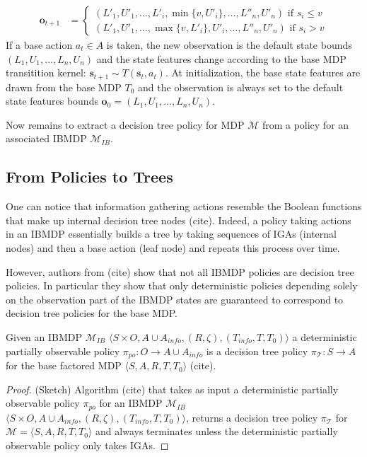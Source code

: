 \begin{definition}
\begin{itemize}
\begin{align*}
    \boldsymbol{o}_{t+1} &= \begin{cases}
        (L'_1, U'_1, \dots , L'_i, \min\{v, U'_i\}, \dots , L''_n, U'_n) \text{ if } s_i \leq v\\
        (L'_1, U'_1, \dots , \max\{v, L'_i\}, U'_i, \dots , L''_n, U'_n) \text{ if } s_i > v
    \end{cases}
\end{align*}
If a base action $a_t\in A$ is taken, the new observation is the default state bounds $(L_1, U_1,\dots, L_n, U_n)$ and the state features change according to the base MDP transitition kernel: $\boldsymbol{s}_{t+1}\sim T(\boldsymbol{s}_t, a_t)$.
At initialization, the base state features are drawn from the base MDP $T_0$ and the observation is always set to the default state features bounds $\boldsymbol{o}_0=(L_1, U_1,\dots, L_n, U_n)$.
\end{itemize}
\end{definition}

Now remains to extract a decision tree policy for MDP $\mathcal{M}$ from a policy for an associated IBMDP $\mathcal{M}_{IB}$. 

\subsection{From Policies to Trees}

One can notice that information gathering actions resemble the Boolean functions that make up internal decision tree nodes (cite).
Indeed, a policy taking actions in an IBMDP essentially builds a tree by taking sequences of IGAs (internal nodes) and then a base action (leaf node) and repeats this process over time.

However, authors from (cite) show that not all IBMDP policies are decision tree policies.
In particular they show that only deterministic policies depending solely on the observation part of the IBMDP states are guaranteed to correspond to decision tree policies for the base MDP.

\begin{proposition} 
    Given an IBMDP $\mathcal{M}_{IB} $ $ \langle S \times O,A \cup A_{info}, (R, \zeta), (T_{info}, T, T_0)\rangle$ a deterministic partially observable policy $\pi_{po}: O \rightarrow A\cup A_{info}$ is a decision tree policy $\pi_{\mathcal{T}}: S \rightarrow A$ for the base factored MDP $\langle S, A, R, T, T_0\rangle$ (cite).
\end{proposition}
\begin{proof}(Sketch) Algorithm (cite) that takes as input a deterministic partially observable policy $\pi_{po}$ for an IBMDP $\mathcal{M}_{IB}$ $\langle S \times O,A \cup A_{info}, (R, \zeta), (T_{info}, T, T_0)\rangle$, returns a decision tree policy $\pi_{\mathcal{T}}$ for $\mathcal{M}=\langle S, A, R, T, T_0\rangle$ and always terminates unless the deterministic partially observable policy only takes IGAs.
\end{proof}

